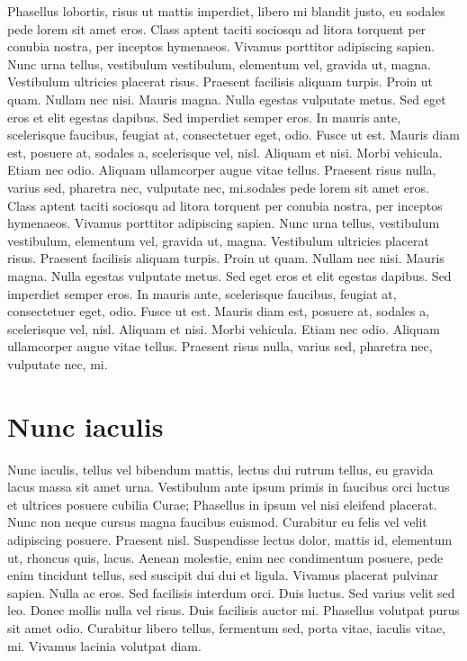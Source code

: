 \documentclass[MSc, ida]{histhesis}
\begin{document}
Phasellus lobortis, risus ut mattis imperdiet, libero mi blandit justo, eu
sodales pede lorem sit amet eros. Class aptent taciti sociosqu ad litora
torquent per conubia nostra, per inceptos hymenaeos. Vivamus porttitor
adipiscing sapien. Nunc urna tellus, vestibulum vestibulum, elementum vel,
gravida ut, magna. Vestibulum ultricies placerat risus. Praesent facilisis
aliquam turpis. Proin ut quam. Nullam nec nisi. Mauris magna. Nulla egestas
vulputate metus. Sed eget eros et elit egestas dapibus. Sed imperdiet semper
eros. In mauris ante, scelerisque faucibus, feugiat at, consectetuer eget,
odio. Fusce ut est. Mauris diam est, posuere at, sodales a, scelerisque vel,
nisl. Aliquam et nisi. Morbi vehicula. Etiam nec odio. Aliquam ullamcorper
augue vitae tellus. Praesent risus nulla, varius sed, pharetra nec, vulputate
nec, mi.sodales pede lorem sit amet eros. Class aptent taciti sociosqu ad litora
torquent per conubia nostra, per inceptos hymenaeos. Vivamus porttitor
adipiscing sapien. Nunc urna tellus, vestibulum vestibulum, elementum vel,
gravida ut, magna. Vestibulum ultricies placerat risus. Praesent facilisis
aliquam turpis. Proin ut quam. Nullam nec nisi. Mauris magna. Nulla egestas
vulputate metus. Sed eget eros et elit egestas dapibus. Sed imperdiet semper
eros. In mauris ante, scelerisque faucibus, feugiat at, consectetuer eget,
odio. Fusce ut est. Mauris diam est, posuere at, sodales a, scelerisque vel,
nisl. Aliquam et nisi. Morbi vehicula. Etiam nec odio. Aliquam ullamcorper
augue vitae tellus. Praesent risus nulla, varius sed, pharetra nec, vulputate
nec, mi.


\section{Nunc iaculis} 

Nunc iaculis, tellus vel bibendum mattis, lectus dui rutrum tellus, eu gravida
lacus massa sit amet urna. Vestibulum ante ipsum primis in faucibus orci luctus
et ultrices posuere cubilia Curae; Phasellus in ipsum vel nisi eleifend
placerat. Nunc non neque cursus magna faucibus euismod.  Curabitur eu felis vel
velit adipiscing posuere. Praesent nisl. Suspendisse lectus dolor, mattis id,
elementum ut, rhoncus quis, lacus. Aenean molestie, enim nec condimentum
posuere, pede enim tincidunt tellus, sed suscipit dui dui et ligula. Vivamus
placerat pulvinar sapien. Nulla ac eros. Sed facilisis interdum orci. Duis
luctus. Sed varius velit sed leo. Donec mollis nulla vel risus. Duis facilisis
auctor mi. Phasellus volutpat purus sit amet odio.  Curabitur libero tellus,
fermentum sed, porta vitae, iaculis vitae, mi. Vivamus lacinia volutpat diam.
\end{document}
